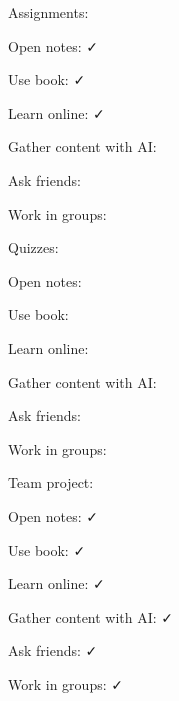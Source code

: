 \documentclass[11pt,usenames,dvipsnames,svgnames,x11names,letterpaper]{article}
\begin{document}
\begin{compactitem}
    \item Assignments:
    \begin{compactitem}
        \item Open notes: \faCheck
        \item Use book: \faCheck
        \item Learn online: \faCheck
        \item Gather content with AI: \faTimesCircle
        \item Ask friends: \faTimesCircle
        \item Work in groups: \faTimesCircle
    \end{compactitem}
    \item Quizzes:
    \begin{compactitem}
        \item Open notes: \faTimesCircle
        \item Use book: \faTimesCircle
        \item Learn online: \faTimesCircle
        \item Gather content with AI: \faTimesCircle
        \item Ask friends: \faTimesCircle
        \item Work in groups: \faTimesCircle
    \end{compactitem}
    \item Team project:
    \begin{compactitem}
        \item Open notes: \faCheck
        \item Use book: \faCheck
        \item Learn online: \faCheck
        \item Gather content with AI: \faCheck
        \item Ask friends: \faCheck
        \item Work in groups: \faCheck
    \end{compactitem}
\end{compactitem}

\end{document}

